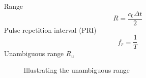 Range
\begin{equation}
	R = \frac{c_0\Delta t}{2}
\end{equation}
Pulse repetition interval (PRI)
\begin{equation}
	f_r = \frac{1}{T}
\end{equation}
Unambiguous range  $R_u$
\begin{figure}
	\centering
	
	\caption{Illustrating the unambiguous range}
\end{figure} 